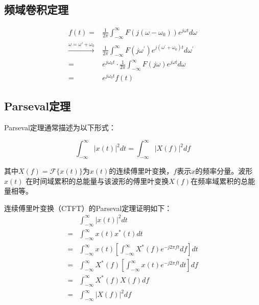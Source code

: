 \documentclass[journal]{IEEEtran}
\begin{document}
\subsection{频域卷积定理}

\begin{equation}
	\begin{split}
		f(t)=&\frac{1}{2 \pi} \int_{-\infty}^{\infty} F\left(j\left(\omega-\omega_{0}\right)\right) e^{j \omega t} d \omega {} \\
		\stackrel{\omega = \omega '  + \omega_0}{\longrightarrow}&\frac{1}{2 \pi} \int_{-\infty}^{\infty} F\left(j \omega^{\prime}\right) e^{j\left(\omega^{\prime}+\omega_{0}\right) t} d \omega^{\prime}  {} \\
		=&e^{j \omega_{0} t} \cdot \frac{1}{2 \pi} \int_{-\infty}^{\infty} F(j \omega) e^{j \omega t} d \omega {} \\ =&e^{j \omega_{0} t} f(t)
	\end{split}
\end{equation}

\subsection{Parseval定理}


Parseval定理通常描述为以下形式：

\begin{equation}
\int_{-\infty}^{\infty}|x(t)|^{2} d t=\int_{-\infty}^{\infty}|X(f)|^{2} d f
\end{equation}

其中$X(f)=\mathcal{F}\{x(t)\}$为$x(t)$的连续傅里叶变换，$f$表示$x$的频率分量。波形$x(t)$
在时间域累积的总能量与该波形的傅里叶变换$X(f)$在频率域累积的总能量相等。

连续傅里叶变换（CTFT）的Parseval定理证明如下：
\begin{equation}
	\begin{aligned} 
		& \int_{-\infty}^{\infty}|x(t)|^{2} d t \\=& \int_{-\infty}^{\infty} x(t) x^{*}(t) d t \\=& \int_{-\infty}^{\infty} x(t)\left[\int_{-\infty}^{\infty} X^{*}(f) e^{-j 2 \pi f t} d f\right] d t \\=& \int_{-\infty}^{\infty} X^{*}(f)\left[\int_{-\infty}^{\infty} x(t) e^{-j 2 \pi f t} d t\right] d f \\=& \int_{-\infty}^{\infty} X^{*}(f) X(f) d f \\=& \int_{-\infty}^{\infty}|X(f)|^{2} d f 
	\end{aligned}
\end{equation}
\end{document}
